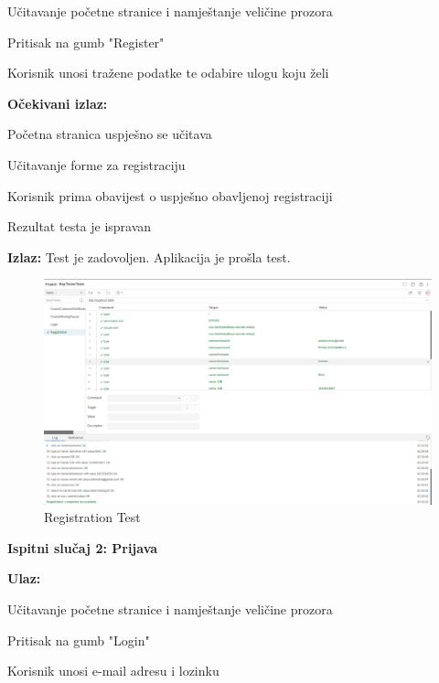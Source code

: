 			\begin{packed_enum}
				
				\item Učitavanje početne stranice i namještanje veličine prozora
				\item Pritisak na gumb "Register"
				\item Korisnik unosi tražene podatke te odabire ulogu koju želi
				
			\end{packed_enum}
			
			\noindent \textbf{Očekivani izlaz:}
			
			\begin{packed_enum}
				
				\item Početna stranica uspješno se učitava
				\item Učitavanje forme za registraciju
				\item Korisnik prima obavijest o uspješno obavljenoj registraciji
				\item Rezultat testa je ispravan
				
			\end{packed_enum}
			
			\noindent \textbf{Izlaz:} Test je zadovoljen. Aplikacija je prošla test.
			
			\begin{figure}[H] \includegraphics[width=\linewidth]{./slike/Testovi/Selenium/Selenium_1.png}
				\caption{Registration Test}
			\end{figure}
			
			\eject
			
			\noindent \textbf{Ispitni slučaj 2: Prijava}
			
			\noindent \textbf{Ulaz:}
			
			\begin{packed_enum}
				
				\item Učitavanje početne stranice i namještanje veličine prozora
				\item Pritisak na gumb "Login"
				\item Korisnik unosi e-mail adresu i lozinku
				
			\end{packed_enum}
			

